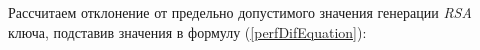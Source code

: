 
Рассчитаем отклонение от предельно допустимого значения генерации \textit{RSA} ключа, подставив значения в формулу (\ref{perfDifEquation}):
